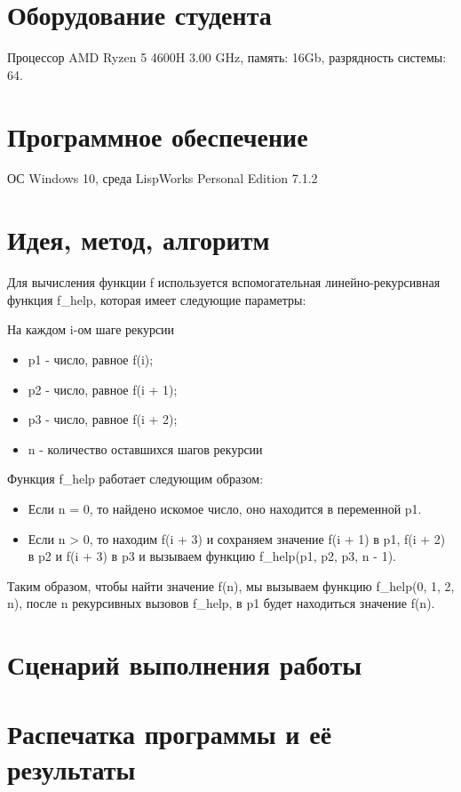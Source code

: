 \documentclass[12pt]{article}
\begin{document}
\section{Оборудование студента}
Процессор AMD Ryzen 5 4600H 3.00 GHz, память: 16Gb, разрядность системы: 64.

\section{Программное обеспечение}
ОС Windows 10, среда LispWorks Personal Edition 7.1.2

\section{Идея, метод, алгоритм}
Для вычисления функции f используется вспомогательная линейно-рекурсивная функция f\_help, которая имеет следующие параметры:

На каждом i-ом шаге рекурсии
\begin{itemize}
    \setlength{\itemsep}{-1mm}
    \item p1 - число, равное f(i);
    \item p2 - число, равное f(i + 1);
    \item p3 - число, равное f(i + 2);
    \item n - количество оставшихся шагов рекурсии
\end{itemize}

Функция f\_help работает следующим образом:
\begin{itemize}
    \item Если n = 0, то найдено искомое число, оно находится в переменной p1.
    \item Если n > 0, то находим f(i + 3) и сохраняем значение f(i + 1) в p1, f(i + 2) в p2 и f(i + 3) в p3 и вызываем функцию f\_help(p1, p2, p3, n - 1).
\end{itemize}

Таким образом, чтобы найти значение f(n), мы вызываем функцию f\_help(0, 1, 2, n), после n рекурсивных вызовов f\_help, в p1 будет находиться значение f(n).

\section{Сценарий выполнения работы}

\section{Распечатка программы и её результаты}
\end{document}
